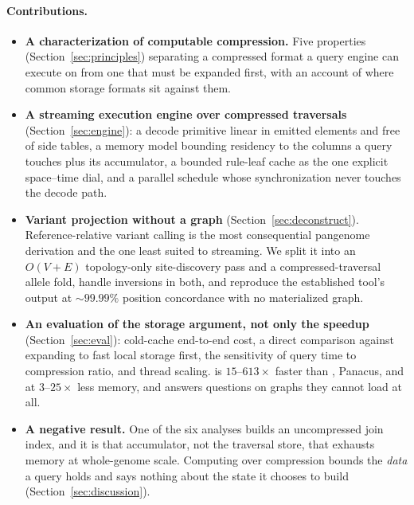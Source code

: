 \paragraph{Contributions.}
\begin{itemize}[noitemsep,topsep=3pt,leftmargin=*]
  \item \textbf{A characterization of computable compression.} Five properties
        (Section~\ref{sec:principles}) separating a compressed format a query
        engine can execute on from one that must be expanded first, with an
        account of where common storage formats sit against them.
  \item \textbf{A streaming execution engine over compressed traversals}
        (Section~\ref{sec:engine}): a decode primitive linear in emitted elements
        and free of side tables, a memory model bounding residency to the columns
        a query touches plus its accumulator, a bounded rule-leaf cache as the one
        explicit space--time dial, and a parallel schedule whose synchronization
        never touches the decode path.
  \item \textbf{Variant projection without a graph}
        (Section~\ref{sec:deconstruct}). Reference-relative variant calling is the
        most consequential pangenome derivation and the one least suited to
        streaming. We split it into an $O(V{+}E)$ topology-only site-discovery
        pass and a compressed-traversal allele fold, handle inversions in both,
        and reproduce the established tool's output at ${\sim}99.99\%$ position
        concordance with no materialized graph.
  \item \textbf{An evaluation of the storage argument, not only the speedup}
        (Section~\ref{sec:eval}): cold-cache end-to-end cost, a direct comparison
        against expanding to fast local storage first, the sensitivity of query
        time to compression ratio, and thread scaling. \sys is $15$--$613\times$
        faster than , Panacus, and  at
        $3$--$25\times$ less memory, and answers questions on graphs they cannot
        load at all.
  \item \textbf{A negative result.} One of the six analyses builds an
        uncompressed join index, and it is that accumulator, not the traversal
        store, that exhausts memory at whole-genome scale. Computing over
        compression bounds the \emph{data} a query holds and says nothing about
        the state it chooses to build (Section~\ref{sec:discussion}).
\end{itemize}
